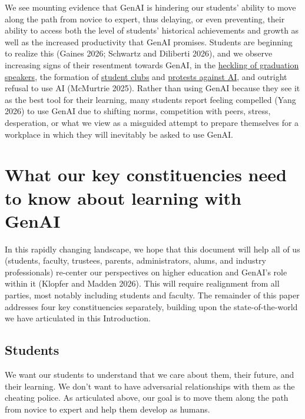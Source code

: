 \documentclass[
]{hdsr}
\begin{document}
We see mounting evidence that GenAI is hindering our students' ability
to move along the path from novice to expert, thus delaying, or even
preventing, their ability to access both the level of students'
historical achievements and growth as well as the increased productivity
that GenAI promises. Students are beginning to realize this (Gaines
2026; Schwartz and Diliberti 2026), and we observe increasing signs of
their resentment towards GenAI, in the
\href{https://www.npr.org/2026/05/20/nx-s1-5822419/ai-colleges-commencement-booing}{heckling
of graduation speakers}, the formation of
\href{https://oberlinreview.org/35718/opinions/luddite-club-implores-oberlin-to-opt-out-of-ai/}{student
clubs} and
\href{https://www.bloomberg.com/news/articles/2026-05-19/ai-on-college-campuses-sparks-pushback-protests-booing-at-graduation}{protests
against AI}, and outright refusal to use AI (McMurtrie 2025). Rather
than using GenAI because they see it as the best tool for their
learning, many students report feeling compelled (Yang 2026) to use
GenAI due to shifting norms, competition with peers, stress,
desperation, or what we view as a misguided attempt to prepare
themselves for a workplace in which they will inevitably be asked to use
GenAI.

\section{What our key constituencies need to know about learning with
GenAI}\label{what-our-key-constituencies-need-to-know-about-learning-with-genai}

In this rapidly changing landscape, we hope that this document will help
all of us (students, faculty, trustees, parents, administrators, alums,
and industry professionals) re-center our perspectives on higher
education and GenAI's role within it (Klopfer and Madden 2026). This
will require realignment from all parties, most notably including
students and faculty. The remainder of this paper addresses four key
constituencies separately, building upon the state-of-the-world we have
articulated in this Introduction.

\subsection{Students}\label{sec-students}

We want our students to understand that we care about them, their
future, and their learning. We don't want to have adversarial
relationships with them as the cheating police. As articulated above,
our goal is to move them along the path from novice to expert and help
them develop as humans.
\end{document}
